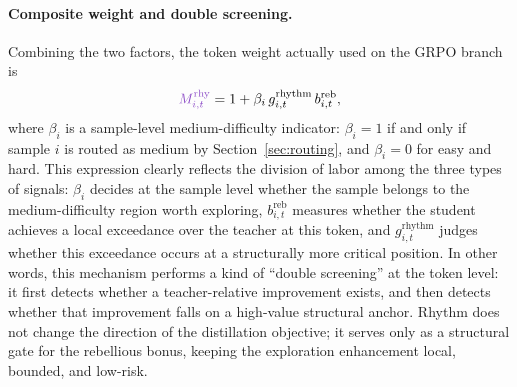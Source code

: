 \documentclass{article}
\begin{document}
\paragraph{Composite weight and double screening.}
Combining the two factors, the token weight actually used on the GRPO branch is
\begin{equation}
\label{eq:rhy-weight}
{\color{cRhythm}M^{\mathrm{rhy}}_{i,t}}
=
1+\beta_i \, g_{i,t}^{\mathrm{rhythm}} \, b_{i,t}^{\mathrm{reb}},
\end{equation}
where $\beta_i$ is a sample-level medium-difficulty indicator: $\beta_i=1$ if and only if sample $i$ is routed as medium by Section~\ref{sec:routing}, and $\beta_i=0$ for easy and hard. This expression clearly reflects the division of labor among the three types of signals: $\beta_i$ decides at the sample level whether the sample belongs to the medium-difficulty region worth exploring, $b_{i,t}^{\mathrm{reb}}$ measures whether the student achieves a local exceedance over the teacher at this token, and $g_{i,t}^{\mathrm{rhythm}}$ judges whether this exceedance occurs at a structurally more critical position. In other words, this mechanism performs a kind of ``double screening'' at the token level: it first detects whether a teacher-relative improvement exists, and then detects whether that improvement falls on a high-value structural anchor. Rhythm does not change the direction of the distillation objective; it serves only as a structural gate for the rebellious bonus, keeping the exploration enhancement local, bounded, and low-risk.
\end{document}
